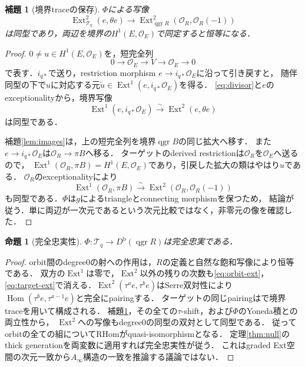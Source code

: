 \documentclass[11pt,a4paper]{ltjsarticle}
\newtheorem{proposition}[theorem]{命題}
\newtheorem{lemma}[theorem]{補題}
\theoremstyle{definition}
\newcommand{\OO}{\mathcal O}
\newcommand{\TT}{\mathcal T}
\newcommand{\Db}{D^{\mathrm b}}
\newcommand{\Hom}{\operatorname{Hom}}
\newcommand{\Ext}{\operatorname{Ext}}
\newcommand{\qgr}{\operatorname{qgr}}
\begin{document}
\begin{lemma}[境界traceの保存]\label{lem:trace}
$\Phi$による写像
\[
 \Ext^2_{\TT_q}(e,\theta e)\longrightarrow
 \Ext^2_{\qgr R}(\OO_R,\OO_R(-1))
\]
は同型であり，両辺を境界の$H^1(E,\OO_E)$で同定すると恒等になる．
\end{lemma}
\begin{proof}
$0\ne u\in H^1(E,\OO_E)$を，短完全列
\[
 0\longrightarrow\OO_E\longrightarrow V\longrightarrow\OO_E\longrightarrow0
\]
で表す．$i_{q*}$で送り，restriction morphism $e\to i_{q*}\OO_E$に沿って引き戻すと，
随伴同型の下で$u$に対応する元$\widetilde u\in\Ext^1(e,i_{q*}\OO_E)$を得る．
\eqref{eq:divisor}と$e$のexceptionalityから，境界写像
\[
 \Ext^1(e,i_{q*}\OO_E)\xrightarrow{\sim}\Ext^2(e,\theta e)
\]
は同型である．

補題\ref{lem:images}は，上の短完全列を境界$\qgr B$の同じ拡大へ移す．
また$e\to i_{q*}\OO_E$は$\OO_R\to\pi B$へ移る．
ターゲットのderived restrictionは$\OO_R$を$\OO_E$へ送るので，
$\Ext^1(\OO_R,\pi B)=H^1(E,\OO_E)$であり，引戻した拡大の類はやはり$u$である．
$\OO_R$のexceptionalityにより
\[
 \Ext^1(\OO_R,\pi B)\xrightarrow{\sim}
 \Ext^2(\OO_R,\OO_R(-1))
\]
も同型である．$\Phi$は$g$によるtriangleとconnecting morphismを保つため，
結論が従う．単に両辺が一次元であるという次元比較ではなく，非零元の像を確認した．
\end{proof}

\begin{proposition}[完全忠実性]\label{prop:ff}
$\Phi:\TT_q\to\Db(\qgr R)$は完全忠実である．
\end{proposition}
\begin{proof}
orbit間のdegree0の射への作用は，$R$の定義と自然な飽和写像により恒等である．
双方の$\Ext^1$は零で，$\Ext^2$以外の残りの次数も\eqref{eq:orbit-ext}，
\eqref{eq:target-ext}で消える．$\Ext^2(\tau^ae,\tau^be)$はSerre双対性により
$\Hom(\tau^be,\tau^{a-1}e)$と完全にpairingする．
ターゲットの同じpairingは\cite[Corollary~3.8の証明]{RF}で境界traceを用いて構成される．
補題\ref{lem:trace}，その全ての$\tau$-shift，および$\Phi$のYoneda積との両立性から，
$\Ext^2$への写像もdegree0の同型の双対として同型である．
従ってorbitの全ての組についてRHomがquasi-isomorphismとなる．
定理\ref{thm:null}のthick generationを両変数に適用すれば完全忠実性が従う．
これはgraded Ext空間の次元一致から$A_\infty$構造の一致を推論する議論ではない．
\end{proof}
\end{document}
